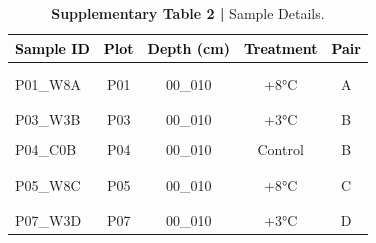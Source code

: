 \documentclass[
  10pt,
  letterpaper,
  DIV=11,
  numbers=noendperiod]{scrartcl}
\begin{document}
\begin{table}[H]
\caption{\textbf{Supplementary Table 2 |} Sample Details.}
\centering
\fontsize{7.5}{9.5}\selectfont
\begin{tabular}[t]{lcccc}
\toprule
\textcolor{black}{\textbf{Sample ID}} & \textcolor{black}{\textbf{Plot}} & \textcolor{black}{\textbf{Depth (cm)}} & \textcolor{black}{\textbf{Treatment}} & \textcolor{black}{\textbf{Pair}}\\
\midrule
\addlinespace[-0.4em]
\multicolumn{5}{l}{\textbf{}}\\
\hspace{1em}\cellcolor{gray!6}{P01\_W3A} & \cellcolor{gray!6}{P01} & \cellcolor{gray!6}{00\_010} & \cellcolor{gray!6}{+3°C} & \cellcolor{gray!6}{A}\\
\hspace{1em}P01\_W8A & P01 & 00\_010 & +8°C & A\\
\hspace{1em}\cellcolor{gray!6}{P02\_C0A} & \cellcolor{gray!6}{P02} & \cellcolor{gray!6}{00\_010} & \cellcolor{gray!6}{Control} & \cellcolor{gray!6}{A}\\
\addlinespace[-0.4em]
\multicolumn{5}{l}{\textbf{}}\\
\hspace{1em}P03\_W3B & P03 & 00\_010 & +3°C & B\\
\hspace{1em}\cellcolor{gray!6}{P03\_W8B} & \cellcolor{gray!6}{P03} & \cellcolor{gray!6}{00\_010} & \cellcolor{gray!6}{+8°C} & \cellcolor{gray!6}{B}\\
\hspace{1em}P04\_C0B & P04 & 00\_010 & Control & B\\
\addlinespace[-0.4em]
\multicolumn{5}{l}{\textbf{}}\\
\hspace{1em}\cellcolor{gray!6}{P05\_W3C} & \cellcolor{gray!6}{P05} & \cellcolor{gray!6}{00\_010} & \cellcolor{gray!6}{+3°C} & \cellcolor{gray!6}{C}\\
\hspace{1em}P05\_W8C & P05 & 00\_010 & +8°C & C\\
\hspace{1em}\cellcolor{gray!6}{P06\_C0C} & \cellcolor{gray!6}{P06} & \cellcolor{gray!6}{00\_010} & \cellcolor{gray!6}{Control} & \cellcolor{gray!6}{C}\\
\addlinespace[-0.4em]
\multicolumn{5}{l}{\textbf{}}\\
\hspace{1em}P07\_W3D & P07 & 00\_010 & +3°C & D\\

\end{tabular}
\end{table}
\end{document}
